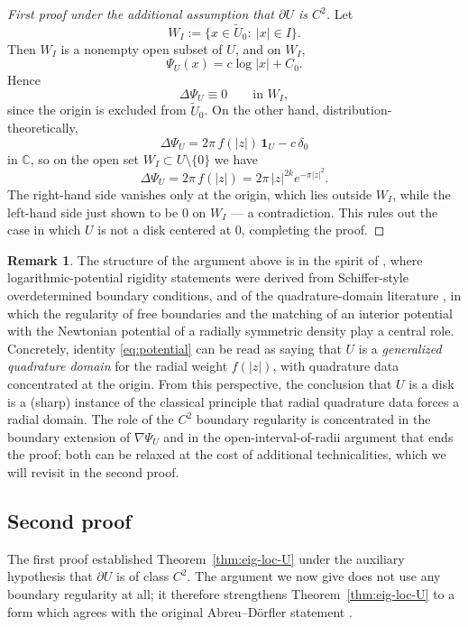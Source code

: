\documentclass[a4paper,11pt,reqno]{amsart}
\numberwithin{equation}{section}
\theoremstyle{plain} %
\theoremstyle{definition} %
\newtheorem{remark}{Remark}[section]
\theoremstyle{remark}
\newcommand{\C}{\mathbb{C}}
\begin{document}
\begin{proof}[First proof under the additional assumption that $\partial U$ is $C^2$]
Let
\[
W_I:=\{x\in \widetilde U_0:\ |x|\in I\}.
\]
Then \(W_I\) is a nonempty open subset of \(U\), and on \(W_I\),
\[
\Psi_U(x)=c\log|x|+C_0.
\]
Hence
\[
\Delta \Psi_U\equiv 0 \qquad \text{in } W_I,
\]
since the origin is excluded from $\widetilde U_0$. On the other hand,
distribution-theoretically,
\[
\Delta \Psi_U=2\pi\, f(|z|)\,\mathbf{1}_U-c\,\delta_0
\]
in $\C$, so on the open set $W_I\subset U\setminus\{0\}$ we have
\[
\Delta \Psi_U=2\pi\, f(|z|)=2\pi\, |z|^{2k}e^{-\pi |z|^2}.
\]
The right-hand side vanishes only at the origin, which lies outside
$W_I$, while the left-hand side just shown to be $0$ on $W_I$ — a
contradiction. This rules out the case in which $U$ is not a disk
centered at $0$, completing the proof.
\end{proof}

\begin{remark}
The structure of the argument above is in the spirit of
\cite{Aharonov-Schiffer-Zalcman}, where logarithmic-potential
rigidity statements were derived from Schiffer-style overdetermined
boundary conditions, and of the quadrature-domain literature
\cite{Gustafsson,Gustafsson-Shahgholian,Shahgholian,Karp}, in which
the regularity of free boundaries and the matching of an interior
potential with the Newtonian potential of a radially symmetric
density play a central role. Concretely, identity
\eqref{eq:potential} can be read as saying that $U$ is a
\emph{generalized quadrature domain} for the radial weight $f(|z|)$,
with quadrature data concentrated at the origin. From this perspective,
the conclusion that $U$ is a disk is a (sharp) instance of the
classical principle that radial quadrature data forces a radial
domain. The role of the $C^2$ boundary regularity is concentrated
in the boundary extension of $\nabla\Psi_U$ and in the
open-interval-of-radii argument that ends the proof; both can be
relaxed at the cost of additional technicalities, which we will
revisit in the second proof.
\end{remark}

\subsection{Second proof}\label{subsec:second-proof}

The first proof established Theorem~\ref{thm:eig-loc-U} under the auxiliary
hypothesis that $\partial U$ is of class $C^2$. The argument we now give does
not use any boundary regularity at all; it therefore strengthens
Theorem~\ref{thm:eig-loc-U} to a form which agrees with the original
Abreu--D\"orfler statement \cite{Abreu-Doerfler}.
\end{document}
